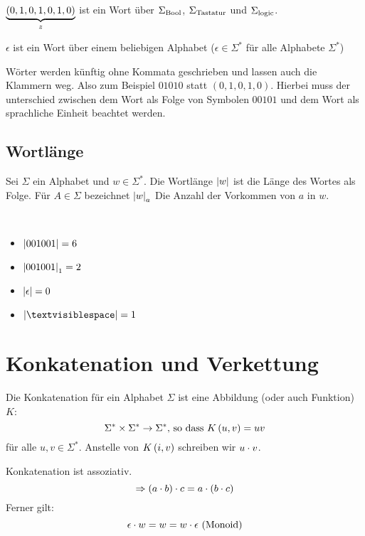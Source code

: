 \begin{example}
$\underbrace{(0, 1, 0, 1, 0, 1, 0)}_{z}$ ist ein Wort über $\Sigma_{\text{Bool}}$, $\Sigma_{\text{Tastatur}}$ und $\Sigma_{\text{logic}}$.
\end{example}

$\epsilon$ ist ein Wort über einem beliebigen Alphabet ($\epsilon \in \Sigma^*$ für alle Alphabete $\Sigma^*$)

\begin{notation}
Wörter werden künftig ohne Kommata geschrieben und lassen auch die Klammern weg. Also zum Beispiel $01010$ statt $(0, 1, 0, 1 , 0)$. Hierbei muss der unterschied zwischen dem Wort als Folge von Symbolen $00101$ und dem Wort als sprachliche Einheit  beachtet werden.
\end{notation}

\subsection{Wortlänge}
\begin{definition}[Wortlänge]
Sei $\Sigma$ ein Alphabet und $w \in \Sigma^*$. Die Wortlänge $\left|w\right|$ ist die Länge des Wortes als Folge. Für $A \in \Sigma$ bezeichnet $\left|w\right|_a$ Die Anzahl der Vorkommen von $a$ in $w$.
\end{definition}

\begin{example}~
\begin{itemize}
\item $\left|001001\right| = 6$
\item $\left|001001\right|_1 = 2$
\item $\left|\epsilon\right| = 0$
\item $\btg{\textvisiblespace} = 1$
\end{itemize}
\end{example}

\section{Konkatenation und Verkettung}
\begin{definition}
Die Konkatenation für ein Alphabet $\Sigma$ ist eine Abbildung (oder auch Funktion) $K$:
\[\Sigma^* \times \Sigma^* \rightarrow \Sigma^* \text{, so dass } K \left(u, v\right) = uv\]
für alle $u, v \in \Sigma^*$. Anstelle von $K \left(i, v\right)$ schreiben wir $u \cdot v$.
\end{definition}

\begin{note}
Konkatenation ist assoziativ.
\[\Rightarrow \left(a \cdot b\right) \cdot c = a \cdot \left(b \cdot c\right)\]
Ferner gilt:
\[\epsilon \cdot w = w = w \cdot \epsilon \text{ (Monoid)}\]
\end{note}

